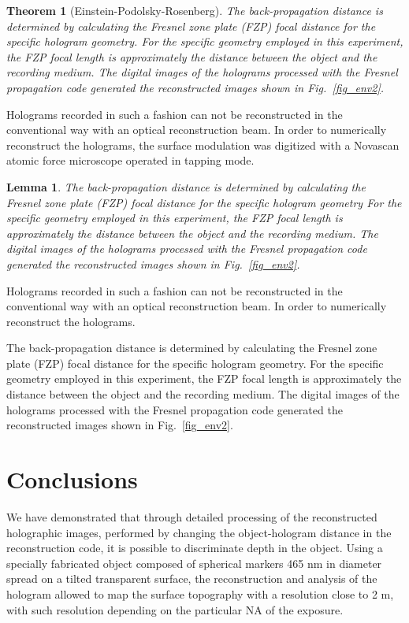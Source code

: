 \documentclass[]{IEEEphot}
\newtheorem{theorem}{Theorem}
\newtheorem{lemma}{Lemma}
\begin{document}
\begin{theorem}[Einstein-Podolsky-Rosenberg]
The back-propagation distance is determined by calculating the Fresnel zone plate (FZP) focal distance for the specific hologram geometry. For the specific geometry employed in this experiment, the FZP focal length is approximately the distance between the object and the recording medium. The digital images of the holograms processed with the Fresnel propagation code generated the reconstructed images shown in Fig.~\ref{fig_env2}.    
\end{theorem}

Holograms recorded in such a fashion can not be reconstructed in the conventional way with an optical reconstruction beam. In order to numerically reconstruct the holograms, the surface modulation was digitized with a Novascan atomic force microscope operated in tapping mode. 

\begin{lemma}
The back-propagation distance is determined by calculating the Fresnel zone plate (FZP) focal distance for the specific hologram geometry  For the specific geometry employed in this experiment, the FZP focal length is approximately the distance between the object and the recording medium. The digital images of the holograms processed with the Fresnel propagation code generated the reconstructed images shown in Fig.~\ref{fig_env2}.    
\end{lemma}

Holograms recorded in such a fashion can not be reconstructed in the conventional way with an optical reconstruction beam. In order to numerically reconstruct the holograms. 

\begin{IEEEproof}%
The back-propagation distance is determined by calculating the Fresnel zone plate (FZP) focal distance for the specific hologram geometry. For the specific geometry employed in this experiment, the FZP focal length is approximately the distance between the object and the recording medium. The digital images of the holograms processed with the Fresnel propagation code generated the reconstructed images shown in Fig.~\ref{fig_env2}.    
\end{IEEEproof}

\section{Conclusions}
 We have demonstrated that through detailed processing of the reconstructed holographic images, performed by changing the object-hologram distance in the reconstruction code, it is possible to discriminate depth in the object. Using a specially fabricated object composed of spherical markers 465 nm in diameter spread on a tilted transparent surface, the reconstruction and analysis of the hologram allowed to map the surface topography with a resolution close to 2 m, with such resolution depending on the particular NA of the exposure. 
\end{document}
